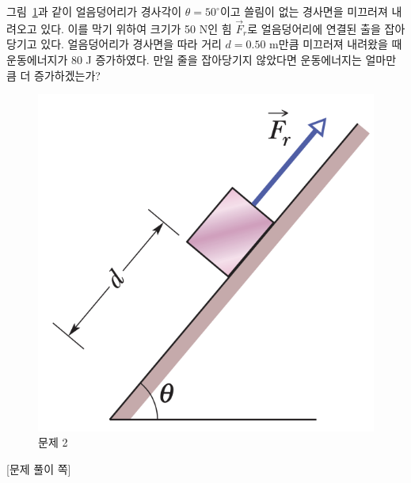 \documentclass[floatfix,nofootinbib,superscriptaddress,fleqn,preprint]{revtex4}
\begin{document}
그림~\ref{fig:2}과 같이 얼음덩어리가 경사각이 $\theta=50^\circ$이고
쓸림이 없는 경사면을 미끄러져 내려오고 있다. 이를 막기 위하여 크기가
50 N인 힘 $\vec{F}_r$로 얼음덩어리에 연결된 출을 잡아당기고
있다. 얼음덩어리가 경사면을 따라 거리 $d=0.50$ m만큼 미끄러져 내려왔을
때 운동에너지가 80 J 증가하였다. 만일 줄을 잡아당기지 않았다면
운동에너지는 얼마만큼 더 증가하겠는가?
\begin{figure}[ht]
  \centering
\includegraphics[scale=0.5]{Qfig8-2-20220328.png}
  \caption{문제 2}
  \label{fig:2}
\end{figure}
\newpage

{\color{gray} [문제 풀이 쪽]}

\newpage 
\end{document}
